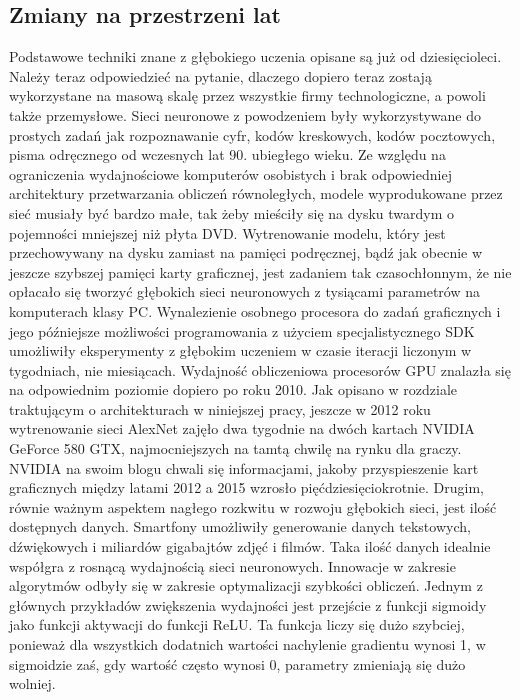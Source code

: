 \documentclass[12pt,a4paper,twoside,titlepage,openright]{book}
\begin{document}
\begin{itemize}
\section{Zmiany na przestrzeni lat}
Podstawowe techniki znane z głębokiego uczenia opisane są już od dziesięcioleci. Należy teraz odpowiedzieć na pytanie, dlaczego dopiero teraz zostają wykorzystane na masową skalę przez wszystkie firmy technologiczne, a powoli także przemysłowe. Sieci neuronowe z powodzeniem były wykorzystywane do prostych zadań jak rozpoznawanie cyfr, kodów kreskowych, kodów pocztowych, pisma odręcznego od wczesnych lat 90. ubiegłego wieku. Ze względu na ograniczenia wydajnościowe komputerów osobistych i brak odpowiedniej architektury przetwarzania obliczeń równoległych, modele wyprodukowane przez sieć musiały być bardzo małe, tak żeby mieściły się na dysku twardym o pojemności mniejszej niż płyta DVD. Wytrenowanie modelu, który jest przechowywany na dysku zamiast na pamięci podręcznej, bądź jak obecnie w jeszcze szybszej pamięci karty graficznej, jest zadaniem tak czasochłonnym, że nie opłacało się tworzyć głębokich sieci neuronowych z tysiącami parametrów na komputerach klasy PC. Wynalezienie osobnego procesora do zadań graficznych i jego późniejsze możliwości programowania z użyciem specjalistycznego SDK umożliwiły eksperymenty z głębokim uczeniem w czasie iteracji liczonym w tygodniach, nie miesiącach. Wydajność obliczeniowa procesorów GPU znalazła się na odpowiednim poziomie dopiero po roku 2010. Jak opisano w rozdziale traktującym o architekturach w niniejszej pracy, jeszcze w 2012 roku wytrenowanie sieci AlexNet zajęło dwa tygodnie na dwóch kartach NVIDIA GeForce 580 GTX, najmocniejszych na tamtą chwilę na rynku dla graczy. NVIDIA na swoim blogu chwali się informacjami, jakoby przyspieszenie kart graficznych między latami 2012 a 2015 wzrosło pięćdziesięciokrotnie. \cite{siteNvidiaAcceleration} Drugim, równie ważnym aspektem nagłego rozkwitu w rozwoju głębokich sieci, jest ilość dostępnych danych. Smartfony umożliwiły generowanie danych tekstowych, dźwiękowych i miliardów gigabajtów zdjęć i filmów. Taka ilość danych idealnie współgra z rosnącą wydajnością sieci neuronowych. Innowacje w zakresie algorytmów odbyły się w zakresie optymalizacji szybkości obliczeń. Jednym z głównych przykładów zwiększenia wydajności jest przejście z funkcji sigmoidy jako funkcji aktywacji do funkcji ReLU. Ta funkcja liczy się dużo szybciej, ponieważ dla wszystkich dodatnich wartości nachylenie gradientu wynosi 1, w sigmoidzie zaś, gdy wartość często wynosi 0, parametry zmieniają się dużo wolniej.


\end{itemize}
\end{document}
